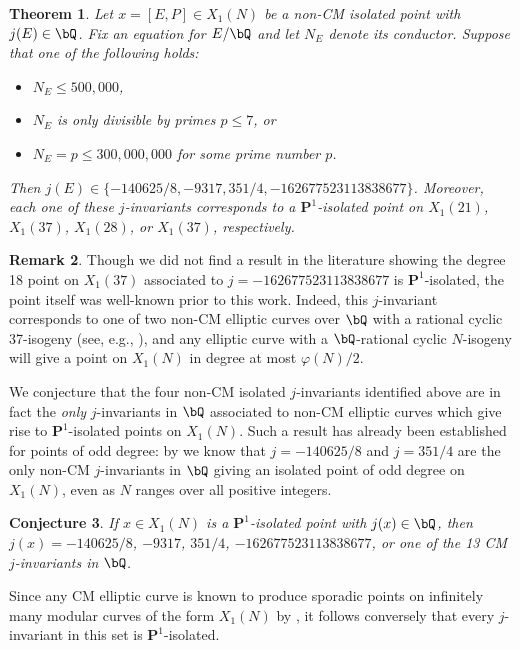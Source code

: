 \documentclass[11pt,reqno]{amsart}
\theoremstyle{plain}
\newtheorem{theorem}{Theorem}%
\newtheorem{conjecture}[theorem]{Conjecture}
\theoremstyle{definition}
\newtheorem{remark}[theorem]{Remark}
\newcommand{\Q}{\bQ}
\newcommand{\PP}{\mathbf P}
\begin{document}
\begin{theorem}\label{LMFDBoutputThm}
Let $x=[E,P]\in X_1(N)$ be a non-CM isolated point with $j(E) \in \Q$.
Fix an equation for $E/\Q$ and let $N_E$ denote its conductor.
Suppose that one of the following holds:
\begin{itemize}
    \item $N_E \leq 500{,}000$,
    \item $N_E$ is only divisible by primes $p \leq 7$, or
    \item $N_E=p \leq 300{,}000{,}000$ for some prime number $p$.
\end{itemize}
Then $j(E) \in \{-140625/8,-9317,351/4, -162677523113838677\}$. Moreover, each one of these $j$-invariants corresponds to a $\PP^1$-isolated point on $X_1(21)$, $X_1(37)$, $X_1(28)$, or $X_1(37)$, respectively.
\end{theorem}

\begin{remark}
Though we did not find a result in the literature showing the degree 18 point on $X_1(37)$ associated to $j=-162677523113838677$ is $\PP^1$-isolated, the point itself was well-known prior to this work. Indeed, this $j$-invariant corresponds to one of two non-CM elliptic curves over $\Q$ with a rational cyclic 37-isogeny (see, e.g., \cite[Table 4]{LRAnn}), and any elliptic curve with a $\Q$-rational cyclic $N$-isogeny will give a point on $X_1(N)$ in degree at most $\varphi(N)/2$.
\end{remark}
We conjecture that the four non-CM isolated $j$-invariants identified above are in fact the \emph{only} $j$-invariants in $\Q$ associated to non-CM elliptic curves which give rise to $\PP^1$-isolated points on $X_1(N)$. Such a result has already been established for points of odd degree: by \cite{OddDeg} we know that $j=-140625/8$ and $j=351/4$ are the only non-CM $j$-invariants in $\Q$ giving an isolated point of odd degree on $X_1(N)$, even as $N$ ranges over all positive integers.


\begin{conjecture}\label{conj}
If $x\in X_1(N)$ is a $\PP^1$-isolated point with $j(x) \in \Q$, then $j(x)=-140625/8$, $-9317$, $351/4$, $-162677523113838677$, or one of the 13 CM $j$-invariants in $\Q$.
\end{conjecture}

\noindent Since any CM elliptic curve is known to produce sporadic points on infinitely many modular curves of the form $X_1(N)$ by \cite[Theorem 7.1]{BELOV}, it follows conversely that every $j$-invariant in this set is $\PP^1$-isolated. 
\end{document}
